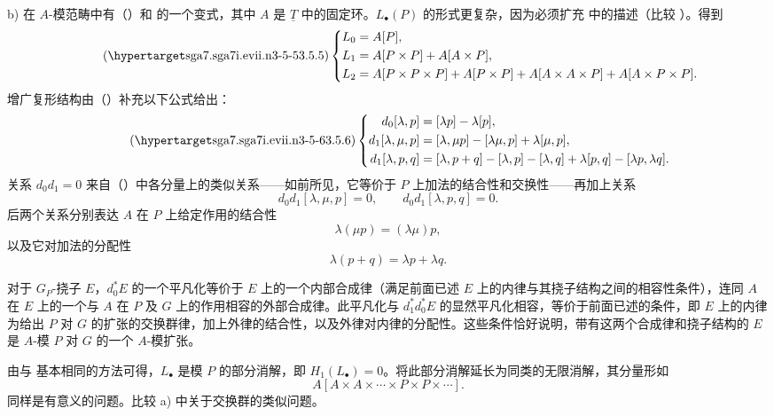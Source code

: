 b) 在 $A$-模范畴中有（）和  的一个变式，其中 $A$ 是 $\underline T$ 中的固定环。$L_\bullet(P)$ 的形式更复杂，因为必须扩充  中的描述（比较 ）。得到
\begin{equation}\tag{\SGARefTarget{sga7.sga7i.evii.n3-5-5}{3.5.5}}
\left\{
\begin{aligned}
 L_0={}&A[P],\\
 L_1={}&A[P\times P]+A[A\times P],\\
 L_2={}&A[P\times P\times P]+A[P\times P]
       +A[A\times A\times P]+A[A\times P\times P].
\end{aligned}
\right.
\end{equation}
增广复形结构由（）补充以下公式给出：
\begin{equation}\tag{\SGARefTarget{sga7.sga7i.evii.n3-5-6}{3.5.6}}
\left\{
\begin{aligned}
 d_0[\lambda,p]={}&[\lambda p]-\lambda[p],\\
 d_1[\lambda,\mu,p]={}&[\lambda,\mu p]-[\lambda\mu,p]
                         +\lambda[\mu,p],\\
 d_1[\lambda,p,q]={}&[\lambda,p+q]-[\lambda,p]-[\lambda,q]
                       +\lambda[p,q]-[\lambda p,\lambda q].
\end{aligned}
\right.
\end{equation}
关系 $d_0d_1=0$ 来自（）中各分量上的类似关系——如前所见，它等价于 $P$ 上加法的结合性和交换性——再加上关系
\[
 d_0d_1[\lambda,\mu,p]=0,
 \qquad d_0d_1[\lambda,p,q]=0.
\]
后两个关系分别表达 $A$ 在 $P$ 上给定作用的结合性
\[
 \lambda(\mu p)=(\lambda\mu)p,
\]
以及它对加法的分配性
\[
 \lambda(p+q)=\lambda p+\lambda q.
\]


对于 $G_P$-挠子 $E$，$d_0^*E$ 的一个平凡化等价于 $E$ 上的一个内部合成律（满足前面已述 $E$ 上的内律与其挠子结构之间的相容性条件），连同 $A$ 在 $E$ 上的一个与 $A$ 在 $P$ 及 $G$ 上的作用相容的外部合成律。此平凡化与 $d_1^*d_0^*E$ 的显然平凡化相容，等价于前面已述的条件，即 $E$ 上的内律为给出 $P$ 对 $G$ 的扩张的交换群律，加上外律的结合性，以及外律对内律的分配性。这些条件恰好说明，带有这两个合成律和挠子结构的 $E$ 是 $A$-模 $P$ 对 $G$ 的一个 $A$-模扩张。

由与  基本相同的方法可得，$L_\bullet$ 是模 $P$ 的部分消解，即 $H_1(L_\bullet)=0$。将此部分消解延长为同类的无限消解，其分量形如
\[
 A[A\times A\times\cdots\times P\times P\times\cdots].
\]
同样是有意义的问题。比较 a) 中关于交换群的类似问题。

